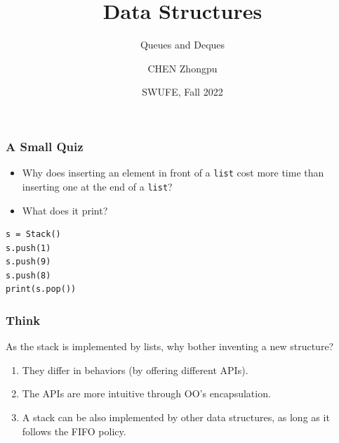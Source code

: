 \documentclass[aspectratio=169, 14pt]{beamer}
\title[Data Structures] %
{Data Structures}
\subtitle{Queues and Deques}
\author[CHEN Zhongpu] %
{CHEN Zhongpu}
\institute[] %
{
  School of Computing and Artificial Intelligence \\
  \href{mailto:zpchen@swufe.edu.cn}{zpchen@swufe.edu.cn}
}
\date[] %
{SWUFE, Fall 2022}
\begin{document}
\frame{\titlepage}

\begin{frame}[fragile]
    \frametitle{A Small Quiz}
    \begin{itemize}
        \item Why does inserting an element in front of a \texttt{list} cost more time than inserting one at the end of a \texttt{list}?
    \end{itemize}
\begin{itemize}
    \item What does it print?
\end{itemize}
    
\begin{verbatim}
s = Stack()
s.push(1)   
s.push(9)
s.push(8)
print(s.pop())
\end{verbatim}
\end{frame}

\begin{frame}
    \frametitle{Think }
As the stack is implemented by lists, why bother inventing a new structure?
    
\begin{enumerate}
    \item They differ in behaviors (by offering different APIs).
    \item The APIs are more intuitive through OO's encapsulation.
    \item A stack can be also implemented by other data structures, as long as it follows the FIFO policy.
\end{enumerate}

\end{frame}
\end{document}
